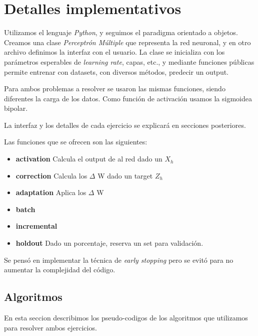 \section{Detalles implementativos}
Utilizamos el lenguaje \textit{Python}, y seguimos el paradigma orientado a objetos. Creamos una clase \textit{Perceptrón Múltiple} que representa la red neuronal, y en otro archivo definimos la interfaz con el usuario. La clase se inicializa con los parámetros esperables de \textit{learning rate}, capas, etc., y mediante funciones públicas permite entrenar con datasets, con diversos métodos, predecir un output. 

Para ambos problemas a resolver se usaron las mismas funciones, siendo diferentes la carga de los datos. Como función de activación usamos la sigmoidea bipolar. 

La interfaz y los detalles de cada ejercicio se explicará en secciones posteriores. 

Las funciones que se ofrecen son las siguientes:
\begin{itemize}
\item \textbf{activation} Calcula el output de al red dado un $X_{h}$
\item \textbf{correction} Calcula los $\Delta$ W dado un target $Z_{h}$
\item \textbf{adaptation} Aplica los $\Delta$ W 
\item \textbf{batch} 
\item \textbf{incremental}
\item \textbf{holdout} Dado un porcentaje, reserva un set para validación. 
\end{itemize}

Se pensó en implementar la técnica de \textit{early stopping} pero se evitó para no aumentar la complejidad del código.

\subsection{Algoritmos}
En esta seccion describimos los pseudo-codigos de los algoritmos que utilizamos para resolver ambos ejercicios.
\begin{center}
\noindent{}
\end{center}

